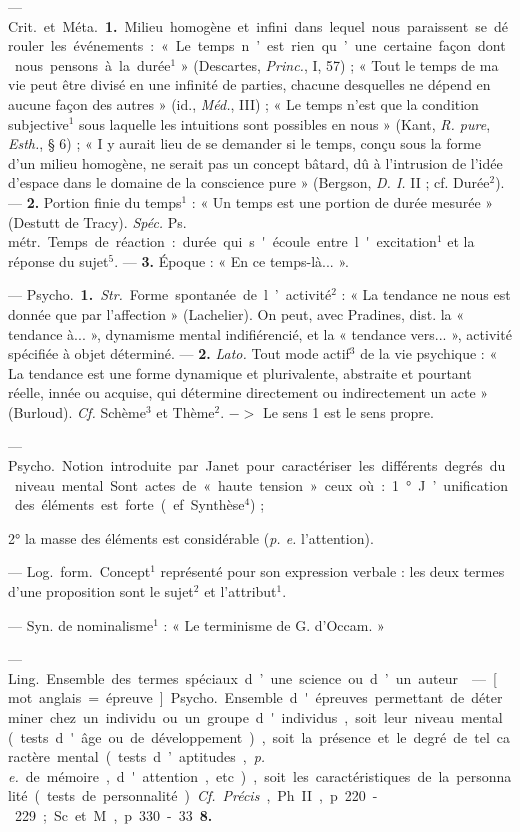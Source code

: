 \begin{itemize}[leftmargin=1cm, label=, itemsep=1pt]
 — \si{Crit.} et \si{Méta.} {\bf 1.} Milieu
homogène et infini dans lequel nous
paraissent se dérouler les événements :
« Le temps n’est rien qu’une
certaine façon dont nous pensons à
la durée$^1$ » (Descartes, {\it Princ.}, I, 57) ;
« Tout le temps de ma vie peut être
divisé en une infinité de parties,
chacune desquelles ne dépend en
aucune façon des autres » (id., \si{{\it Méd.}},
III) ; « Le temps n’est que la condition subjective$^1$ sous laquelle les
intuitions sont possibles en nous »
(Kant, {\it R. pure}, {\it Esth.}, § 6) ; « I y
aurait lieu de se demander si le
temps, conçu sous la forme d’un
milieu homogène, ne serait pas un
concept bâtard, dû à l’intrusion de
l’idée d'espace dans le domaine de
la conscience pure » (Bergson, {\it D. I.}
II ; cf. Durée$^2$). — {\bf 2.} Portion finie
du temps$^1$ : « Un temps est une portion de durée mesurée » (Destutt
de Tracy). {\it Spéc.} \si{Ps. métr.} Temps de
réaction : durée qui s'écoule entre
l'excitation$^1$ et la réponse du sujet$^5$.
— {\bf 3.} Époque : « En ce temps-là... ».

 — \si{Psycho.} {\bf 1.} {\it Str.} Forme
spontanée de l’activité$^2$ : « La tendance ne nous est donnée que par
l’affection » (Lachelier). On peut,
avec Pradines, dist. la « tendance
à... », dynamisme mental indifiérencié, et la « tendance vers... »,
activité spécifiée à objet déterminé.
— {\bf 2.} {\it Lato.} Tout mode actif$^3$ de la
vie psychique : « La tendance est
une forme dynamique et plurivalente, abstraite et pourtant réelle,
innée ou acquise, qui détermine
directement ou indirectement un
acte » (Burloud). {\it Cf.} Schème$^3$ et
Thème$^2$. $->$ Le sens 1 est le sens
propre.

 — \si{Psycho.}
Notion introduite par Janet pour
caractériser les différents degrés du
niveau mental. Sont actes de « haute
tension » ceux où : 1° J’unification
des éléments est forte (ef. Synthèse$^4$) ;

2° la masse des éléments est considérable ({\it p. e.} l'attention).

 — \si{Log.} \si{form.} Concept$^1$ représenté pour son expression verbale :
les deux termes d’une proposition
sont le sujet$^2$ et l’attribut$^1$.

 — Syn. de nominalisme$^1$ :
« Le terminisme de G. d’Occam. »

 — \si{Ling.} Ensemble des
termes spéciaux d’une science ou
d’un auteur.

 — [mot anglais = épreuve] \si{Psycho.}
Ensemble d'épreuves permettant
de déterminer chez un individu
ou un groupe d'individus, soit
leur niveau mental (tests d'âge
ou de développement), soit la présence et le degré de tel caractère
mental (tests d’aptitudes, {\it p. e.} de
mémoire, d'attention, etc.), soit les
caractéristiques de la personnalité
(tests de personnalité). {\it Cf.} {\it Précis},
Ph. II, p. 220-229; Sc. et M., p. 330-33 {\bf 8.}


\end{itemize}
